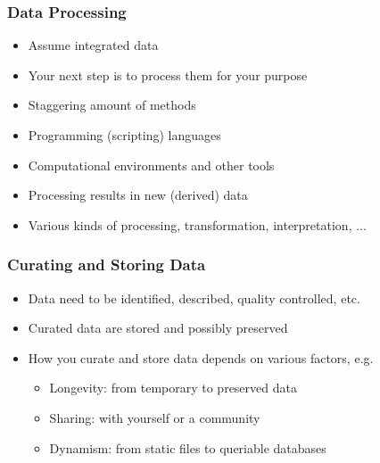 \documentclass{beamer}
\begin{document}
\begin{frame}
  \frametitle{Data Processing}
  
  \begin{itemize}
  \item Assume integrated data
  \item Your next step is to process them for your purpose
  \item Staggering amount of methods
  \item Programming (scripting) languages
  \item Computational environments and other tools
  \item Processing results in new (derived) data
  \item Various kinds of processing, transformation, interpretation, ...
  \end{itemize}
\end{frame}

\begin{frame}
  \frametitle{Curating and Storing Data}
  
  \begin{itemize}
  \item Data need to be identified, described, quality controlled, etc.
  \item Curated data are stored and possibly preserved
  \item How you curate and store data depends on various factors, e.g.
  \begin{itemize}
  \item Longevity: from temporary to preserved data
  \item Sharing: with yourself or a community
  \item Dynamism: from static files to queriable databases
  \end{itemize}
  \end{itemize}
\end{frame}
\end{document}
